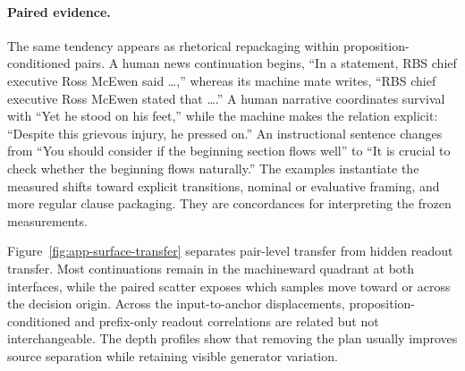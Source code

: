 \paragraph{Paired evidence.} The same tendency appears as rhetorical repackaging within proposition-conditioned pairs. A human news continuation begins, ``In a statement, RBS chief executive Ross McEwen said \ldots,'' whereas its machine mate writes, ``RBS chief executive Ross McEwen stated that \ldots.'' A human narrative coordinates survival with ``Yet he stood on his feet,'' while the machine makes the relation explicit: ``Despite this grievous injury, he pressed on.'' An instructional sentence changes from ``You should consider if the beginning section flows well'' to ``It is crucial to check whether the beginning flows naturally.'' The examples instantiate the measured shifts toward explicit transitions, nominal or evaluative framing, and more regular clause packaging. They are concordances for interpreting the frozen measurements.

Figure~\ref{fig:app-surface-transfer} separates pair-level transfer from hidden readout transfer. Most continuations remain in the machineward quadrant at both interfaces, while the paired scatter exposes which samples move toward or across the decision origin. Across the input-to-anchor displacements, proposition-conditioned and prefix-only readout correlations are related but not interchangeable. The depth profiles show that removing the plan usually improves source separation while retaining visible generator variation.

